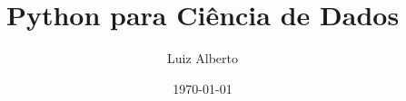 \documentclass[t, final, 12pt, xcolor={usenames,dvipsnames}, table]{beamer}
\author{Luiz Alberto}
\title{Python para Ciência de Dados}
\institute{Ciência da Computação}
\date{\today}
\begin{document}
  \begin{frame}[t,plain]
    \titlepage
  \end{frame}
  
  
  
  
  
  
  
  
  
  
  
  
\end{document}
